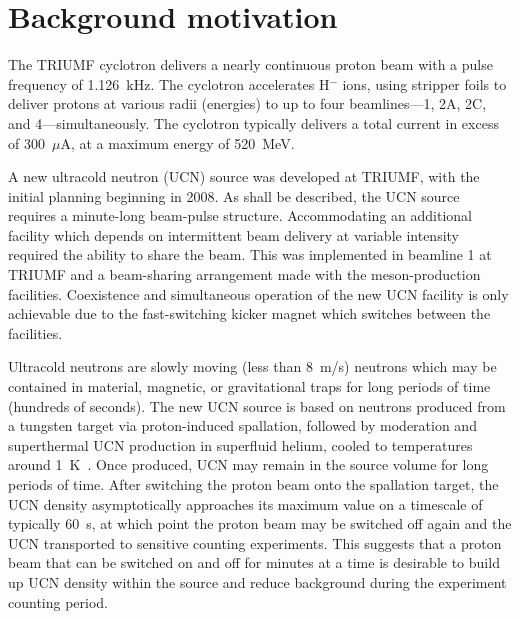 \documentclass[aps,prab,twocolumn,superscriptaddress]{revtex4-1}
\begin{document}
\pacs{}

\maketitle

\section{Background motivation}

The TRIUMF cyclotron delivers a nearly continuous proton beam with a pulse frequency of 1.126~kHz.
The cyclotron accelerates H$^-$ ions, 
using stripper foils to deliver protons at various radii
(energies) to up to four beamlines---1, 2A, 2C, and 4---simultaneously.  The cyclotron
typically delivers a total current in excess of 300~$\mu$A, at a
maximum energy of 520~MeV.

A new ultracold neutron (UCN) source was
developed at TRIUMF, with the initial planning beginning in 2008.  As shall be described, the UCN source requires a minute-long beam-pulse structure.  
Accommodating an additional facility which depends on intermittent beam delivery at variable intensity required the ability to share the beam.  This was implemented in beamline 1 at TRIUMF and a beam-sharing arrangement made with the meson-production facilities.
Coexistence and simultaneous operation of the new UCN facility is only achievable due to the fast-switching kicker magnet which switches between the facilities.

Ultracold neutrons are slowly moving (less than 8~m/s) neutrons
which may be contained in material, magnetic, or gravitational
traps for long periods of time (hundreds of seconds).  The new UCN source is
based on neutrons produced from a tungsten target via
proton-induced spallation, followed by moderation and superthermal UCN production in
superfluid helium,
cooled to temperatures around 1~K~\cite{GOLUB1975133,PhysRevC.92.024004,KOROBKINA2002462}.  Once produced, UCN may remain in the source
volume for long periods of time.  After switching the proton beam onto the spallation target, the UCN density asymptotically approaches its maximum value on a timescale of typically 60~s, at which
point the proton beam may be switched off again and the UCN transported to
sensitive counting experiments.  This suggests that a proton beam that can be switched on and off for minutes at a time is desirable to build up UCN density within
the source and reduce background during the experiment counting period.
\end{document}
